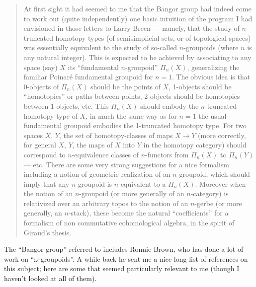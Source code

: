 \documentclass[12pt]{article}
\begin{document}
\begin{quote}
At first sight it had seemed to me that the Bangor group had indeed come
to work out (quite independently) one basic intuition of the program I
had envisioned in those letters to Larry Breen --- namely, that the
study of \(n\)-truncated homotopy types (of semisimplicial sets, or of
topological spaces) was essentially equivalent to the study of so-called
\(n\)-groupoids (where \(n\) is any natural integer). This is expected
to be achieved by associating to any space (say) \(X\) its ``fundamental
\(n\)-groupoid'' \(\Pi_n(X)\), generalizing the familiar Poinar\'e
fundamental groupoid for \(n = 1\). The obvious idea is that 0-objects
of \(\Pi_n(X)\) should be the points of \(X\), 1-objects should be
``homotopies'' or paths between points, 2-objects should be homotopies
between 1-objects, etc. This \(\Pi_n(X)\) should embody the
\(n\)-truncated homotopy type of \(X\), in much the same way as for
\(n = 1\) the usual fundamental groupoid embodies the 1-truncated
homotopy type. For two spaces \(X\), \(Y\), the set of homotopy-classes
of maps \(X \to Y\) (more correctly, for general \(X\), \(Y\), the maps
of \(X\) into \(Y\) in the homotopy category) should correspond to
\(n\)-equivalence classes of \(n\)-functors from \(\Pi_n(X)\) to
\(\Pi_n(Y)\) --- etc. There are some very strong suggestions for a nice
formalism including a notion of geometric realization of an
\(n\)-groupoid, which should imply that any \(n\)-groupoid is
\(n\)-equivalent to a \(\Pi_n(X)\). Moreover when the notion of an
\(n\)-groupoid (or more generally of an \(n\)-category) is relativized
over an arbitrary topos to the notion of an \(n\)-gerbe (or more
generally, an \(n\)-stack), these become the natural ``coefficients''
for a formalism of non commutative cohomological algebra, in the spirit
of Giraud's thesis.
\end{quote}

The ``Bangor group'' referred to includes Ronnie Brown, who has done a
lot of work on ``\(\omega\)-groupoids''. A while back he sent me a nice
long list of references on this subject; here are some that seemed
particularly relevant to me (though I haven't looked at all of them).
\end{document}
